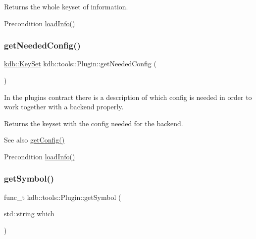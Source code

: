 Returns the whole keyset of information. 

\begin{DoxyPrecond}{Precondition}
\mbox{\hyperlink{classkdb_1_1tools_1_1Plugin_a3a0c6a956d1714002ef9baf8c9d99167}{load\+Info()}} 
\end{DoxyPrecond}
\mbox{\label{classkdb_1_1tools_1_1Plugin_ad2a0a4a64d17c479e7cd8b1402275cc7}} 
\subsubsection{\texorpdfstring{getNeededConfig()}{getNeededConfig()}}
{\footnotesize\ttfamily \mbox{\hyperlink{classkdb_1_1KeySet}{kdb\+::\+Key\+Set}} kdb\+::tools\+::\+Plugin\+::get\+Needed\+Config (\begin{DoxyParamCaption}{ }\end{DoxyParamCaption})}



In the plugin\textquotesingle{}s contract there is a description of which config is needed in order to work together with a backend properly. 

\begin{DoxyReturn}{Returns}
the keyset with the config needed for the backend. 
\end{DoxyReturn}
\begin{DoxySeeAlso}{See also}
\mbox{\hyperlink{classkdb_1_1tools_1_1Plugin_af3004444f5ef05dc8106646ff2b95694}{get\+Config()}} 
\end{DoxySeeAlso}
\begin{DoxyPrecond}{Precondition}
\mbox{\hyperlink{classkdb_1_1tools_1_1Plugin_a3a0c6a956d1714002ef9baf8c9d99167}{load\+Info()}} 
\end{DoxyPrecond}
\mbox{\label{classkdb_1_1tools_1_1Plugin_aca31140802ab463d5bddd95dee73194d}} 
\subsubsection{\texorpdfstring{getSymbol()}{getSymbol()}}
{\footnotesize\ttfamily func\+\_\+t kdb\+::tools\+::\+Plugin\+::get\+Symbol (\begin{DoxyParamCaption}\item[{std\+::string}]{which }\end{DoxyParamCaption})\hspace{0.3cm}{\ttfamily [inline]}}



